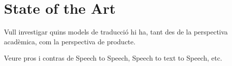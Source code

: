 \section{State of the Art}

Vull investigar quins models de traducció hi ha, tant des de la perspectiva acadèmica, com la perspectiva de producte.

Veure pros i contras de Speech to Speech, Speech to text to Speech, etc.

